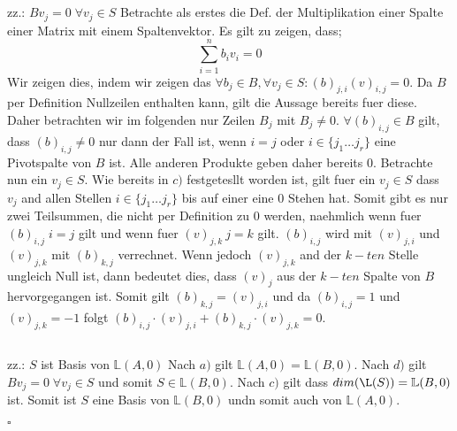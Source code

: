 \documentclass{article}
\begin{document}
\subsection{}
zz.: $Bv_{j} = 0 \; \forall v_{j} \in S$
Betrachte als erstes die Def. der Multiplikation einer Spalte einer Matrix mit einem Spaltenvektor. Es gilt zu zeigen, dass;
\begin{equation}
\sum_{i = 1}^{n} b_{i}  v_{i} = 0
\end{equation}
Wir zeigen dies, indem wir zeigen das $\forall b_{j} \in B, \forall v_{j} \in S : (b)_{j,i} (v)_{i,j} = 0$.
Da $B$ per Definition Nullzeilen enthalten kann, gilt die Aussage bereits fuer diese. Daher betrachten wir im folgenden nur Zeilen $B_{j}$ mit $B_{j} \neq 0$. $\forall (b)_{i,j} \in B$ gilt, dass $(b)_{i,j} \neq 0$ nur dann der Fall ist, wenn $i = j$ oder $i \in \{j_{1} \dots j_{r}\} $ eine Pivotspalte von $B$ ist. Alle anderen Produkte geben daher bereits 0.
Betrachte nun ein $v_{j} \in S$. Wie bereits in $c)$ festgetesllt worden ist, gilt fuer ein $v_{j} \in S$ dass $v_{j}$ and allen Stellen $i \in \{j_{1} \dots j_{r}\}$ bis auf einer eine 0 Stehen hat. Somit gibt es nur zwei Teilsummen, die nicht per Definition zu 0 werden, naehmlich wenn fuer $(b)_{i,j} \; i = j$ gilt und wenn fuer $(v)_{j,k} \:j = k$ gilt. $(b)_{i,j}$ wird mit $(v)_{j,i}$ und $(v)_{j,k}$ mit $(b)_{k,j}$ verrechnet. Wenn jedoch $(v)_{j,k}$ and der $k-ten$ Stelle ungleich Null ist, dann bedeutet dies, dass $(v)_{j}$ aus der $k-ten$ Spalte von $B$ hervorgegangen ist. Somit gilt $(b)_{k,j} = (v)_{j,i}$ und da $(b)_{i,j} = 1$ und $(v)_{j,k} = -1$ folgt $(b)_{i,j} \cdot (v)_{j,i} + (b)_{k,j} \cdot (v)_{j,k} =0$.

\subsection{}
zz.: $S$ ist Basis von $\mathbb{L}(A,0)$
Nach $a)$ gilt $\mathbb{L}(A,0) = \mathbb{L}(B,0)$. Nach $d)$ gilt $Bv_{j} = 0 \; \forall v_{j} \in S$ und somit $S \in \mathbb{L}(B,0)$. Nach $c)$ gilt dass $dim(\L(S)) = \mathbb{L}(B,0)$ ist. Somit ist $S$ eine Basis von $\mathbb{L}(B,0)$ undn somit auch von $\mathbb{L}(A,0)$.

\hfill $\square$
\end{document}
